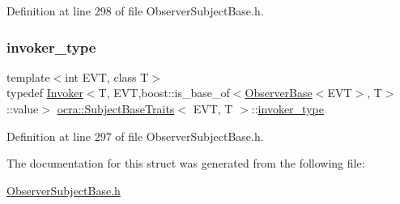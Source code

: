 Definition at line 298 of file Observer\+Subject\+Base.\+h.

\hypertarget{structocra_1_1SubjectBaseTraits_a7d6f024ca6d59f607025916cbb7a3423}{}\label{structocra_1_1SubjectBaseTraits_a7d6f024ca6d59f607025916cbb7a3423} 
\subsubsection{\texorpdfstring{invoker\+\_\+type}{invoker\_type}}
{\footnotesize\ttfamily template$<$int E\+VT, class T$>$ \\
typedef \hyperlink{classocra_1_1Invoker}{Invoker}$<$T, E\+VT,boost\+::is\+\_\+base\+\_\+of$<$\hyperlink{classocra_1_1ObserverBase}{Observer\+Base}$<$E\+VT$>$, T$>$\+::value$>$ \hyperlink{structocra_1_1SubjectBaseTraits}{ocra\+::\+Subject\+Base\+Traits}$<$ E\+VT, T $>$\+::\hyperlink{structocra_1_1SubjectBaseTraits_a7d6f024ca6d59f607025916cbb7a3423}{invoker\+\_\+type}}



Definition at line 297 of file Observer\+Subject\+Base.\+h.



The documentation for this struct was generated from the following file\+:\begin{DoxyCompactItemize}
\item 
\hyperlink{ObserverSubjectBase_8h}{Observer\+Subject\+Base.\+h}\end{DoxyCompactItemize}
